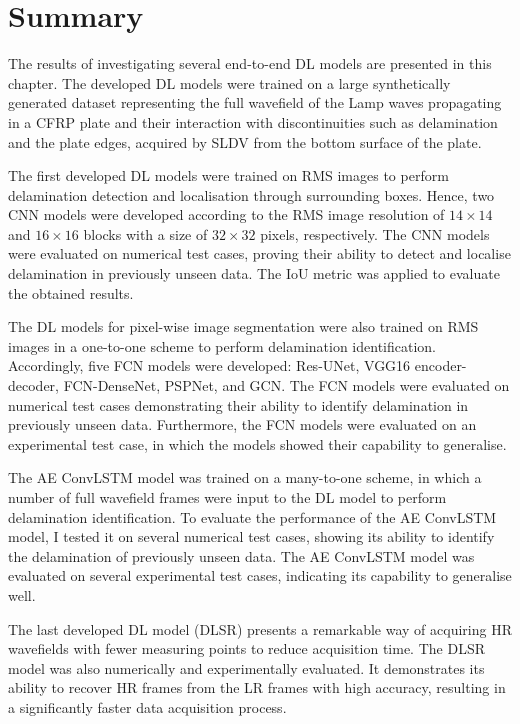 \section{Summary}
\label{sec55}

The results of investigating several end-to-end DL models are presented in this chapter. 
The developed DL models were trained on a large synthetically generated dataset representing the full wavefield of the Lamp waves propagating in a CFRP plate and their interaction with discontinuities such as delamination and the plate edges, acquired by SLDV from the bottom surface of the plate. 

The first developed DL models were trained on RMS images to perform delamination detection and localisation through surrounding boxes.
Hence, two CNN models were developed according to the RMS image resolution of $14\times14$ and $16\times16$ blocks with a size of $32\times32$ pixels, respectively.
The CNN models were evaluated on numerical test cases, proving their ability to detect and localise delamination in previously unseen data.
The IoU metric was applied to evaluate the obtained results.

The DL models for pixel-wise image segmentation were also trained on RMS images in a one-to-one scheme to perform delamination identification.
Accordingly, five FCN models were developed: Res-UNet, VGG16 encoder-decoder, FCN-DenseNet, PSPNet, and GCN.
The FCN models were evaluated on numerical test cases demonstrating their ability to identify delamination in previously unseen data. 
Furthermore, the FCN models were evaluated on an experimental test case, in which the models showed their capability to generalise.

The AE ConvLSTM model was trained on a many-to-one scheme, in which a number of full wavefield frames were input to the DL model to perform delamination identification.
To evaluate the performance of the AE ConvLSTM model, I tested it on several numerical test cases, showing its ability to identify the delamination of previously unseen data.
The AE ConvLSTM model was evaluated on several experimental test cases, indicating its capability to generalise well.

The last developed DL model (DLSR) presents a remarkable way of acquiring HR wavefields with fewer measuring points to reduce acquisition time.
The DLSR model was also numerically and experimentally evaluated. 
It demonstrates its ability to recover HR frames from the LR frames with high accuracy, resulting in a significantly faster data acquisition process.




